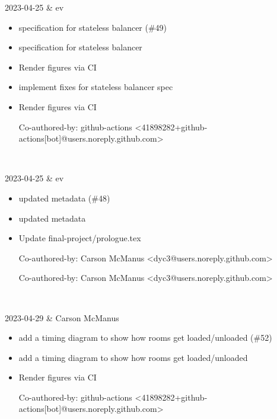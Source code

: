 2023-04-25 & ev
\begin{itemize}[topsep=0pt,itemsep=0pt,parsep=0pt,partopsep=0pt,leftmargin=12pt]
\item specification for stateless balancer (\#49)

\item specification for stateless balancer

\item Render figures via CI

\item implement fixes for stateless balancer spec

\item Render figures via CI



Co-authored-by: github-actions <41898282+github-actions[bot]@users.noreply.github.com>
\end{itemize}
\\ \hline

2023-04-25 & ev
\begin{itemize}[topsep=0pt,itemsep=0pt,parsep=0pt,partopsep=0pt,leftmargin=12pt]
\item updated metadata (\#48)

\item updated metadata

\item Update final-project/prologue.tex

Co-authored-by: Carson McManus <dyc3@users.noreply.github.com>



Co-authored-by: Carson McManus <dyc3@users.noreply.github.com>
\end{itemize}
\\ \hline

2023-04-29 & Carson McManus
\begin{itemize}[topsep=0pt,itemsep=0pt,parsep=0pt,partopsep=0pt,leftmargin=12pt]
\item add a timing diagram to show how rooms get loaded/unloaded (\#52)

\item add a timing diagram to show how rooms get loaded/unloaded

\item Render figures via CI



Co-authored-by: github-actions <41898282+github-actions[bot]@users.noreply.github.com>
\end{itemize}
\\ \hline

